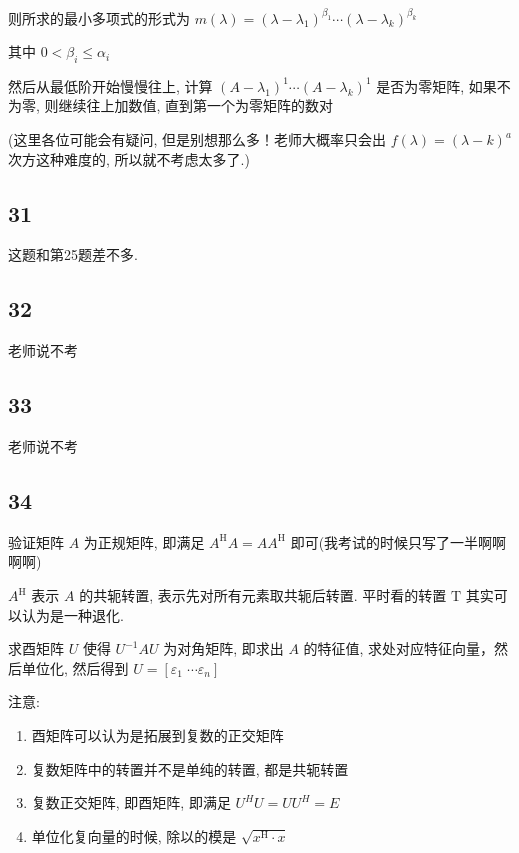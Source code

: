 \documentclass[a4paper, draft]{article}
\begin{document}
则所求的最小多项式的形式为 $m(\lambda)=(\lambda-\lambda_1)^{\beta_1}\cdots(\lambda-\lambda_k)^{\beta_k}$

其中 $0<\beta_i\leqslant\alpha_i$

然后从最低阶开始慢慢往上, 计算 $(A-\lambda_1)^{1}\cdots(A-\lambda_k)^1$ 是否为零矩阵, 如果不为零, 则继续往上加数值, 直到第一个为零矩阵的数对

(这里各位可能会有疑问, 但是别想那么多！老师大概率只会出 $f(\lambda)=(\lambda-k)^a$ 次方这种难度的, 所以就不考虑太多了.)

\subsection*{31}

这题和第25题差不多.

\subsection*{32}

老师说不考

\subsection*{33}

老师说不考

\subsection*{34}

验证矩阵 $A$ 为正规矩阵, 即满足 $A^{\text{H}}A=AA^{\text{H}}$ 即可(我考试的时候只写了一半啊啊啊啊)

$A^{\text{H}}$ 表示 $A$ 的共轭转置, 表示先对所有元素取共轭后转置. 平时看的转置 $\text{T}$ 其实可以认为是一种退化.

求酉矩阵 $U$ 使得  $U^{-1}AU$ 为对角矩阵, 即求出 $A$ 的特征值, 求处对应特征向量，然后单位化, 然后得到 $U=[\varepsilon_1\;\cdots\varepsilon_n]$

注意:  

\begin{enumerate}
    \item 酉矩阵可以认为是拓展到复数的正交矩阵
    \item 复数矩阵中的转置并不是单纯的转置, 都是共轭转置
    \item 复数正交矩阵, 即酉矩阵, 即满足 $U^{H}U=UU^{H}=E$
    \item 单位化复向量的时候, 除以的模是 $\sqrt{x^{\text{H}}\cdot x}$
\end{enumerate}
\end{document}
